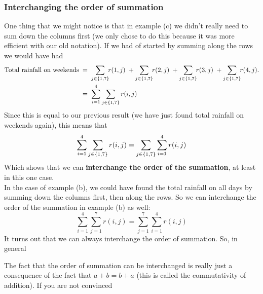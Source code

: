 \subsubsection{Interchanging the order of summation} \label{Interchanging the order of summation}
One thing that we might notice is that in example (c) we didn't really need to sum down the columns first (we only chose to do this because it was more efficient with our old notation). If we had of started by summing along the rows we would have had
\begin{align*}
\text{Total rainfall on weekends} \; & = \; \sum_{j \in \set{1,7}}\!\!r(1,j) \; + \sum_{j \in \set{1,7}}\!\!r(2,j) \; + \sum_{j \in \set{1,7}}\!\!r(3,j) \; + \sum_{j \in \set{1,7}}\!\!r(4,j). \\
	& = \; \sum_{i=1}^4\sum_{j \in \set{1,7}} r(i,j)
\end{align*}
Since this is equal to our previous result (we have just found total rainfall on weekends again), this means that
\[
\sum_{i=1}^4\sum_{j \in \left\{1,7\right\}} r(i,j) = \sum_{j \in \left\{1,7\right\}}\sum_{i = 1}^4 r(i,j)
\]
Which shows that we can \textbf{interchange the order of the summation}, at least in this one case. \\

\noindent In the case of example (b), we could have found the total rainfall on all days by summing down the columns first, then along the rows. So we can interchange the order of the summation in example (b) as well:
\[
 \sum_{i = 1}^4\sum_{j = 1}^7 r(i,j) =  \sum_{j = 1}^7\sum_{i = 1}^4 r(i,j)
\]
It turns out that we can always interchange the order of summation. So, in general

  	\bigskip
	
	\hfil{}
	\bigskip
	\bigskip

\noindent The fact that the order of summation can be interchanged is really just a consequence of the fact that $a + b = b + a$ (this is called the commutativity of addition). If you are not convinced 

